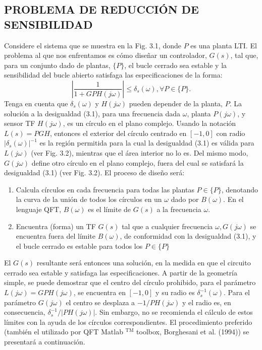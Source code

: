 \subsection{PROBLEMA DE REDUCCIÓN DE SENSIBILIDAD}
Considere el sistema que se muestra en la Fig. 3.1, donde $P$ es una planta LTI. El problema al que nos enfrentamos es cómo diseñar un controlador, $G(s)$, tal que, para un conjunto dado de plantas, $\{P\}$, el bucle cerrado sea estable y la sensibilidad del bucle abierto satisfaga las especificaciones de la forma:
$$
\left|\frac{1}{1+G P H(j \omega)}\right| \leq \delta_{s}(\omega), \forall P \in\{P\} .
$$
Tenga en cuenta que $\delta_{s}(\omega)$ y $H(j \omega)$ pueden depender de la planta, $P$. La solución a la desigualdad (3.1), para una frecuencia dada $\omega$, planta $P(j \omega)$, y sensor TF $H(j \omega)$, es un círculo en el plano complejo. Usando la notación $L(s)=P G H$, entonces el exterior del círculo centrado en $[-1,0]$ con radio $\left|\delta_{s}(\omega)\right|^{-1}$ es la región permitida para la cual la desigualdad (3.1) es válida para $L(j \omega)$ (ver Fig. 3.2), mientras que el área interior no lo es. Del mismo modo, $G(j \omega)$ define otro círculo en el plano complejo, fuera del cual se satisfará la desigualdad (3.1) (ver Fig. 3.2). El proceso de diseño será:

\begin{enumerate}
  \item Calcula círculos en cada frecuencia para todas las plantas $P \in\{P\}$, denotando la curva de la unión de todos los círculos en un $\omega$ dado por $B(\omega)$. En el lenguaje QFT, $B(\omega)$ es el límite de $G(s)$ a la frecuencia $\omega$.

  \item Encuentra (forma) un TF $G(s)$ tal que a cualquier frecuencia $\omega, G(j \omega)$ se encuentra fuera del límite $B(\omega)$, de conformidad con la desigualdad (3.1), y el bucle cerrado es estable para todos los $P \in\{P\}$

\end{enumerate}
El $G(s)$ resultante será entonces una solución, en la medida en que el circuito cerrado sea estable y satisfaga las especificaciones. A partir de la geometría simple, se puede demostrar que el centro del círculo prohibido, para el parámetro $L(j \omega)=G P H(j \omega)$, se encuentra en $[-1,0]$ y su radio es $\delta_{s}^{-1}(\omega)$. Para el parámetro $G(j \omega)$ el centro se desplaza a $-1 / P H(j \omega)$ y el radio es, en consecuencia, $\delta_{s}^{-1} /| P H(j \omega)|$. Sin embargo, no se recomienda el cálculo de estos límites con la ayuda de los círculos correspondientes. El procedimiento preferido (también el utilizado por QFT Matlab ${ }^{\mathrm{TM}}$ toolbox, Borghesani et al. (1994)) se presentará a continuación.

